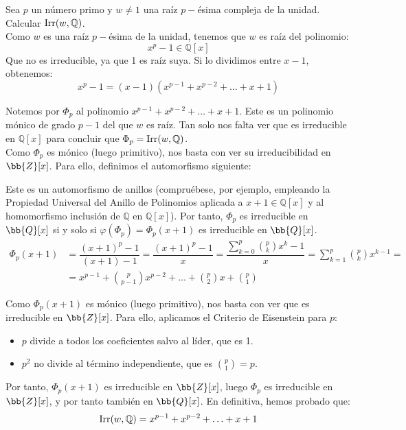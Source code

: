 \begin{ejercicio}
    Sea $p$ un número primo y $w\neq 1$ una raíz $p-$ésima compleja de la unidad. Calcular $\operatorname{Irr}(w,\mathbb{Q})$.\\

    \noindent
    Como $w$ es una raíz $p-$ésima de la unidad, tenemos que $w$ es raíz del polinomio:
    \begin{equation*}
        x^p - 1\in \mathbb{Q}[x]
    \end{equation*}
    Que no es irreducible, ya que 1 es raíz suya. Si lo dividimos entre $x-1$, obtenemos:
    \begin{equation*}
        x^p-1 = (x-1)(x^{p-1} + x^{p-2} + \ldots + x + 1)
    \end{equation*}

    Notemos por $\Phi_p$ al polinomio $x^{p-1} + x^{p-2} + \ldots + x + 1$. Este es un polinomio mónico de grado $p-1$ del que $w$ es raíz. Tan solo nos falta ver que es irreducible en $\mathbb{Q}[x]$ para concluir que $\Phi_p = \operatorname{Irr}(w,\mathbb{Q})$.\\

    Como $\Phi_p$ es mónico (luego primitivo), nos basta con ver su irreducibilidad en $\bb{Z}[x]$. Para ello, definimos el automorfismo siguiente:

    Este es un automorfismo de anillos (compruébese, por ejemplo, empleando la Propiedad Universal del Anillo de Polinomios aplicada a $x+1 \in \mathbb{Q}[x]$ y al homomorfismo inclusión de $\mathbb{Q}$ en $\mathbb{Q}[x]$). Por tanto, $\Phi_p$ es irreducible en $\bb{Q}[x]$ si y solo si $\varphi(\Phi_p)=\Phi_p(x+1)$ es irreducible en $\bb{Q}[x]$.
    \begin{align*}
        \Phi_p(x+1) &= \dfrac{(x+1)^p - 1}{(x+1) - 1} = \dfrac{(x+1)^p - 1}{x} = \dfrac{\sum\limits_{k=0}^{p} \binom{p}{k} x^k - 1}{x} = \sum\limits_{k=1}^{p} \binom{p}{k} x^{k-1}
        =\\&= x^{p-1} + \binom{p}{p-1}x^{p-2} + \ldots + \binom{p}{2}x + \binom{p}{1}
    \end{align*}

    Como $\Phi_p(x+1)$ es mónico (luego primitivo), nos basta con ver que es irreducible en $\bb{Z}[x]$. Para ello, aplicamos el Criterio de Eisenstein para $p$:
    \begin{itemize}
        \item $p$ divide a todos los coeficientes salvo al líder, que es 1.
        \item $p^2$ no divide al término independiente, que es $\binom{p}{1} = p$.
    \end{itemize}
    Por tanto, $\Phi_p(x+1)$ es irreducible en $\bb{Z}[x]$, luego $\Phi_p$ es irreducible en $\bb{Z}[x]$, y por tanto también en $\bb{Q}[x]$. En definitiva, hemos probado que:
    \begin{equation*}
        \operatorname{Irr}(w,\mathbb{Q}) = x^{p-1} + x^{p-2} + \ldots + x + 1
    \end{equation*}
\end{ejercicio}


